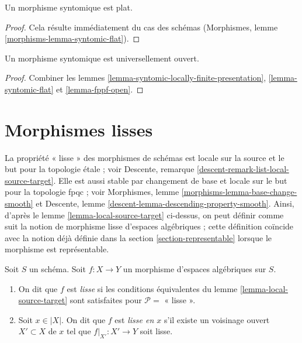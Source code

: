 \begin{lemma}
\label{lemma-syntomic-flat}
Un morphisme syntomique est plat.
\end{lemma}

\begin{proof}
Cela résulte immédiatement du cas des schémas
(Morphismes, lemme \ref{morphisms-lemma-syntomic-flat}).
\end{proof}

\begin{lemma}
\label{lemma-syntomic-open}
Un morphisme syntomique est universellement ouvert.
\end{lemma}

\begin{proof}
Combiner les
lemmes \ref{lemma-syntomic-locally-finite-presentation},
\ref{lemma-syntomic-flat} et
\ref{lemma-fppf-open}.
\end{proof}





\section{Morphismes lisses}
\label{section-smooth}

\noindent
La propriété « lisse » des morphismes de schémas est
locale sur la source et le but pour la topologie étale ; voir
Descente, remarque \ref{descent-remark-list-local-source-target}.
Elle est aussi stable par changement de base et locale sur le but pour la topologie fpqc ; voir
Morphismes, lemme \ref{morphisms-lemma-base-change-smooth}
et
Descente, lemme \ref{descent-lemma-descending-property-smooth}.
Ainsi, d'après le
lemme \ref{lemma-local-source-target}
ci-dessus, on peut définir comme suit la notion de morphisme lisse d'espaces
algébriques ; cette définition coïncide avec la notion déjà définie dans la
section \ref{section-representable}
lorsque le morphisme est représentable.

\begin{definition}
\label{definition-smooth}
Soit $S$ un schéma.
Soit $f : X \to Y$ un morphisme d'espaces algébriques sur $S$.
\begin{enumerate}
\item On dit que $f$ est {\it lisse} si les conditions équivalentes du
lemme \ref{lemma-local-source-target} sont satisfaites pour
$\mathcal{P} =$ « lisse ».
\item Soit $x \in |X|$. On dit que $f$ est {\it lisse en $x$} s'il existe
un voisinage ouvert $X' \subset X$ de $x$ tel que $f|_{X'} : X' \to Y$
soit lisse.
\end{enumerate}
\end{definition}

